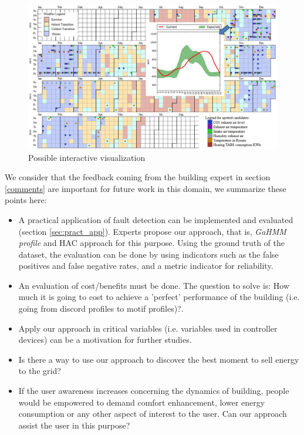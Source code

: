 \begin{figure}[h!]
  \vspace{0.5em} %
  \includegraphics[scale=0.4]{Figures/future.jpg}
  \caption{Possible interactive visualization}
  \label{fig:future_work}
\end{figure} 

We consider that the feedback coming from the building expert in section \ref{comments} are important for future work in this domain, we summarize these points here:   

\begin{itemize}

\item A practical application of fault detection can be implemented and evaluated (section \ref{sec:pract_app}). Experts propose our approach, that is, \textit{GaHMM profile} and HAC approach for this purpose. Using the ground truth of the dataset, the evaluation can be done by using indicators such as the false positives and false negative rates, and a metric indicator for reliability. 

\item An evaluation of cost/benefits must be done. The question to solve is: How much it is going to cost to achieve a 'perfect' performance of the building (i.e. going from discord profiles to motif profiles)?. 

\item Apply our approach in critical variables (i.e. variables used in controller devices) can be a motivation for further studies. 

\item Is there a way to use our approach to discover the best moment to sell energy to the grid?

\item If the user awareness increases concerning the dynamics of building, people would be empowered to demand comfort enhancement, lower energy consumption or any other aspect of interest to the user. Can our approach assist the user in this purpose?

\end{itemize}
    


 







